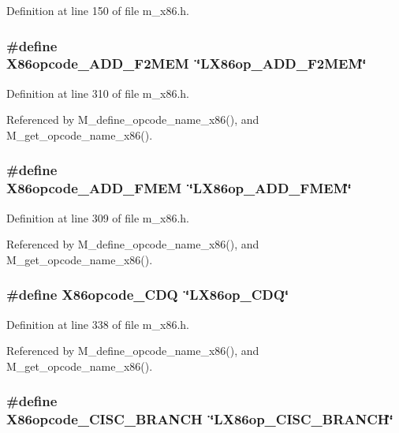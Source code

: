 Definition at line 150 of file m\_\-x86.h.
\subsubsection{\setlength{\rightskip}{0pt plus 5cm}\#define X86opcode\_\-ADD\_\-F2MEM~\char`\"{}LX86op\_\-ADD\_\-F2MEM\char`\"{}}\label{m__x86_8h_6b53b7b5ffa066a1bea784ccbe42d894}




Definition at line 310 of file m\_\-x86.h.

Referenced by M\_\-define\_\-opcode\_\-name\_\-x86(), and M\_\-get\_\-opcode\_\-name\_\-x86().
\subsubsection{\setlength{\rightskip}{0pt plus 5cm}\#define X86opcode\_\-ADD\_\-FMEM~\char`\"{}LX86op\_\-ADD\_\-FMEM\char`\"{}}\label{m__x86_8h_62a189d188f6f7cae7533315165438ae}




Definition at line 309 of file m\_\-x86.h.

Referenced by M\_\-define\_\-opcode\_\-name\_\-x86(), and M\_\-get\_\-opcode\_\-name\_\-x86().
\subsubsection{\setlength{\rightskip}{0pt plus 5cm}\#define X86opcode\_\-CDQ~\char`\"{}LX86op\_\-CDQ\char`\"{}}\label{m__x86_8h_9d029dccaaaf7c98c52a5f00be6a0005}




Definition at line 338 of file m\_\-x86.h.

Referenced by M\_\-define\_\-opcode\_\-name\_\-x86(), and M\_\-get\_\-opcode\_\-name\_\-x86().
\subsubsection{\setlength{\rightskip}{0pt plus 5cm}\#define X86opcode\_\-CISC\_\-BRANCH~\char`\"{}LX86op\_\-CISC\_\-BRANCH\char`\"{}}\label{m__x86_8h_a9fda3c286d5a5b243a12bbbfdd50892}




